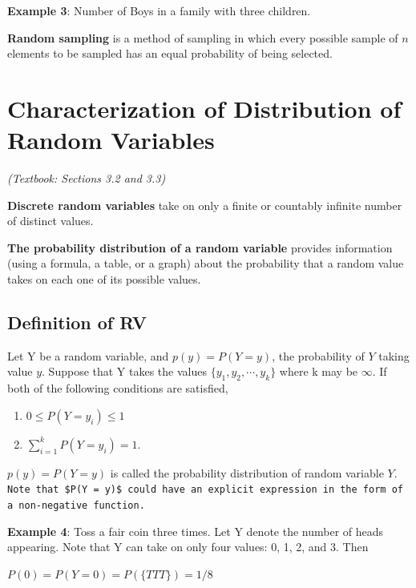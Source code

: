 \documentclass[
]{book}
\begin{document}
\textbf{Example 3}: Number of Boys in a family with three children.

\textbf{Random sampling} is a method of sampling in which every possible sample of \(n\) elements to be sampled has an equal probability of being selected.

\hypertarget{characterization-of-distribution-of-random-variables}{%
\section{Characterization of Distribution of Random Variables}\label{characterization-of-distribution-of-random-variables}}

\emph{(Textbook: Sections 3.2 and 3.3)}

\textbf{Discrete random variables} take on only a finite or countably infinite number of distinct values.

\textbf{The probability distribution of a random variable} provides information (using a formula, a table, or a graph) about the probability that a random value takes on each one of its possible values.

\hypertarget{definition-of-rv}{%
\subsection{Definition of RV}\label{definition-of-rv}}

Let Y be a random variable, and \(p(y) = P(Y =y)\), the probability of \(Y\) taking value \(y\). Suppose that Y takes the values \(\{ y_1, y_2, \cdots, y_k\}\) where k may be \(\infty\). If both of the following conditions are satisfied,

\begin{enumerate}
\def\labelenumi{\arabic{enumi}.}
\item
  \(0 \le P(Y = y_i) \le 1\)
\item
  \(\sum_{i=1}^k P(Y=y_i) = 1\).
\end{enumerate}

\(p(y) = P(Y =y)\) is called the probability distribution of random variable \(Y\). \texttt{Note\ that\ \$P(Y\ =\ y)\$\ could\ have\ an\ explicit\ expression\ in\ the\ form\ of\ a\ non-negative\ function.}

\textbf{Example 4}: Toss a fair coin three times. Let Y denote the number of heads appearing. Note that Y can take on only four values: 0, 1, 2, and 3. Then

\(P(0) = P(Y = 0) = P(\{ TTT\}) = 1/8\)
\end{document}
